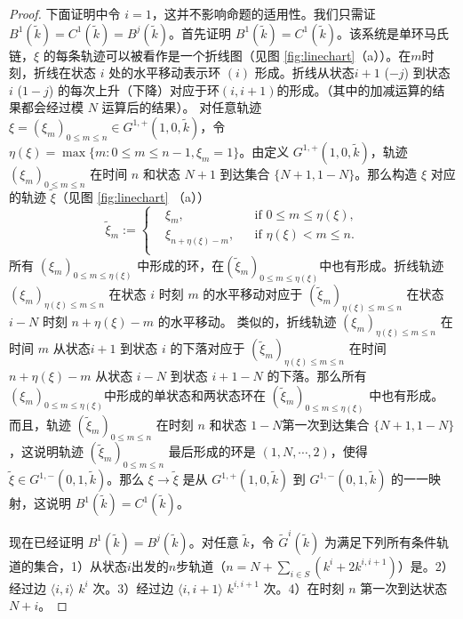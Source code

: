 \begin{proof}
    下面证明中令 $i=1$，这并不影响命题的适用性。我们只需证 $B^1(\tilde{k})=C^1(\tilde{k})=B^j(\tilde{k})$。首先证明 $B^1(\tilde{k})=C^1(\tilde{k})$。该系统是单环马氏链，$\xi$ 的每条轨迹可以被看作是一个折线图（见图 \ref{fig:linechart}（a））。在$m$时刻，折线在状态 $i$ 处的水平移动表示环 $(i)$ 形成。折线从状态$i+1$ ($-j$) 到状态 $i$ ($1-j$) 的每次上升（下降）对应于环$(i, i+1)$的形成。（其中的加减运算的结果都会经过模 $N$ 运算后的结果）。
    对任意轨迹 $\xi=(\xi_m)_{0\le m\le n}\in G^{1,+}(1,0,\tilde{k})$，令 $\eta(\xi)=\max\{m: 0\le m\le n-1,\xi_m=1\}$。由定义 $G^{1,+}(1,0,\tilde{k})$，轨迹 $(\xi_m)_{0\le m\le n}$ 在时间 $n$ 和状态 $N+1$ 到达集合 $\{N+1,1-N\}$。那么构造 $\xi$ 对应的轨迹 $\tilde{\xi}$（见图 \ref{fig:linechart} （a））
	\begin{equation*}
		\tilde{\xi}_m
		:=\left\{\begin{aligned}
			&\xi_m,    && \text{if } 0\le m\le \eta(\xi),\\
			&\xi_{n+\eta(\xi)-m},    && \text{if }\eta(\xi)<m\le n.\\
		\end{aligned}\right.
	\end{equation*}
    所有 $(\xi_m)_{0\le m\le \eta(\xi)}$ 中形成的环，在$(\tilde{\xi}_m)_{0\le m\le \eta(\xi)}$中也有形成。折线轨迹 $(\xi_m)_{\eta(\xi)\le m\le n}$ 在状态 $i$ 时刻 $m$ 的水平移动对应于 $(\tilde{\xi}_m)_{\eta(\xi)\le m\le n}$ 在状态 $i-N$ 时刻 $n+\eta(\xi)-m$ 的水平移动。
    类似的，折线轨迹 $(\xi_m)_{\eta(\xi)\le m\le n}$ 在时间 $m$ 从状态$i+1$ 到状态 $i$ 的下落对应于 $(\tilde{\xi}_m)_{\eta(\xi)\le m\le n}$ 在时间 $n+\eta(\xi)-m$ 从状态 $i-N$ 到状态 $i+1-N$ 的下落。那么所有 $(\xi_m)_{0\le m\le \eta(\xi)}$中形成的单状态和两状态环在 $(\tilde{\xi}_m)_{0\le m\le \eta(\xi)}$ 中也有形成。
    而且，轨迹 $(\tilde{\xi}_m)_{0\le m\le n}$ 在时刻 $n$ 和状态 $1-N$第一次到达集合 $\{N+1,1-N\}$，这说明轨迹 $(\tilde{\xi}_m)_{0\le m\le n}$ 最后形成的环是 $(1,N,\cdots,2)$，使得 $\tilde{\xi}\in G^{1,-}(0,1,\tilde{k})$。那么 $\xi\to \tilde{\xi}$ 是从 $G^{1,+}(1,0,\tilde{k})$ 到 $G^{1,-}(0,1,\tilde{k})$ 的一一映射，这说明 $B^1(\tilde{k})=C^1(\tilde{k})$。

    现在已经证明 $B^1(\tilde{k})=B^j(\tilde{k})$。对任意 $\tilde{k}$，令 $\tilde{G}^i(\tilde{k})$ 为满足下列所有条件轨道的集合，1）从状态$i$出发的$n$步轨道（$n=N+\sum_{i \in S}(k^i+2k^{i,i+1})$）是。2）经过边 $\langle i,i\rangle$ $k^i$ 次。3）经过边 $\langle i,i+1\rangle$ $k^{i,i+1}$ 次。4）在时刻 $n$ 第一次到达状态 $N+i$。


\end{proof}
